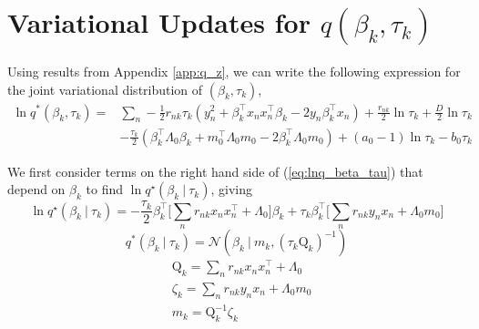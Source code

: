 \documentclass[twoside,11pt]{article}
\newcommand\given[1][]{\:#1\vert\:}
\newcommand{\transpose}[1]{#1^{\intercal}}
\begin{document}
\section{Variational Updates for $q(\beta_k, \tau_k)$} \label{app:beta_tau}  
Using results from Appendix \ref{app:q_z}, we can write the following expression for the joint variational distribution of $(\beta_k, \tau_k)$, 
\begin{equation} \label{eq:lnq_beta_tau}
\begin{split}
	\ln q^{*}(\beta_k, \tau_k) = & \sum_{n} -\frac{1}{2} r_{nk} \tau_k \left( y_n^2 + \transpose{\beta_k} x_n \transpose{x_n} \beta_k - 2y_n \transpose{\beta_k} x_n \right) + \frac{r_{nk}}{2} \ln \tau_k + \frac{D}{2} \ln \tau_k \\
	& - \frac{\tau_k}{2} \left( \transpose{\beta_k} \Lambda_0 \beta_k + \transpose{m_0} \Lambda_0 m_0 - 2\transpose{\beta_k}\Lambda_0m_0\right) + (a_0 - 1) \ln \tau_k - b_0 \tau_k
\end{split}
\end{equation}

We first consider terms on the right hand side of (\ref{eq:lnq_beta_tau}) that depend on $\beta_k$ to find $\ln q^{\star}(\beta_k \given \tau_k)$, giving
\begin{equation} \label{eq:lnq_beta}
	\ln q^{\star}(\beta_k \given \tau_k) = -\frac{\tau_k}{2} \transpose{\beta_k} \Big[ \sum_{n}r_{nk} x_n \transpose{x_n} + \Lambda_0 \Big] \beta_k + \tau_k \transpose{\beta_k} \Big[ \sum_{n} r_{nk}y_n x_n + \Lambda_0 m_0 \Big]
\end{equation}
\begin{equation} \label{q_beta}
	q^{*}(\beta_k \given \tau_k) = \mathcal{N}\left(\beta_k \given m_k, (\tau_k \mathrm{Q}_k)^{-1} \right)
\end{equation}
\begin{equation} \label{eq:beta_params}
\begin{split}
    & \mathrm{Q}_k = \sum_{n} r_{nk} x_n \transpose{x_n} + \Lambda_0 \\
 	& \zeta_k = \sum_{n} r_{nk} y_n x_n + \Lambda_0 m_0 \\
	& m_k = \mathrm{Q}_k^{-1}  \zeta_k 
\end{split}
\end{equation}
\end{document}
